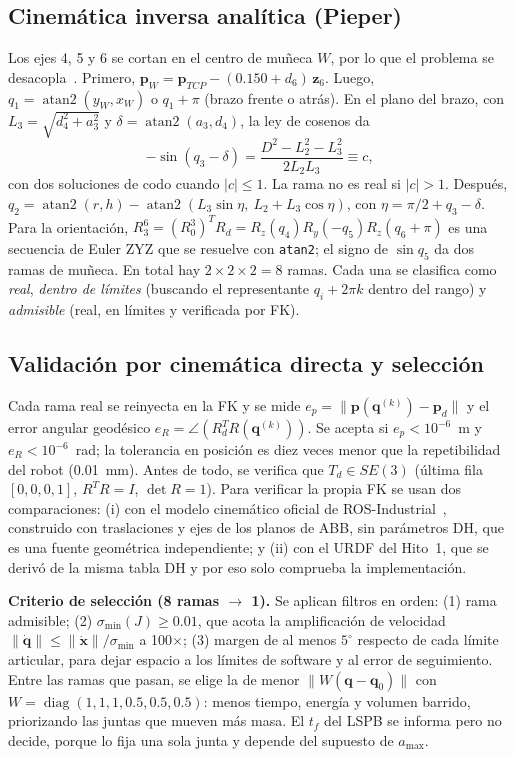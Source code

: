 \documentclass[conference]{IEEEtran}
\begin{document}
\subsection{Cinemática inversa analítica (Pieper)}
Los ejes 4, 5 y 6 se cortan en el centro de muñeca $W$, por lo que el problema se desacopla~\cite{pieper}. Primero,
$\mathbf{p}_W = \mathbf{p}_{TCP} - (0.150 + d_6)\,\mathbf{z}_6$. Luego,
$q_1 = \operatorname{atan2}(y_W, x_W)$ o $q_1 + \pi$ (brazo frente o atrás). En el plano del brazo, con
$L_3 = \sqrt{d_4^2 + a_3^2}$ y $\delta = \operatorname{atan2}(a_3, d_4)$, la ley de cosenos da
\begin{equation}
-\sin(q_3 - \delta) = \frac{D^2 - L_2^2 - L_3^2}{2L_2L_3} \equiv c,
\label{eq:cos}
\end{equation}
con dos soluciones de codo cuando $|c| \le 1$. La rama no es real si $|c| > 1$. Después,
$q_2 = \operatorname{atan2}(r, h) - \operatorname{atan2}(L_3\sin\eta,\ L_2 + L_3\cos\eta)$, con
$\eta = \pi/2 + q_3 - \delta$. Para la orientación,
$R_3^6 = (R_0^3)^TR_d = R_z(q_4)R_y(-q_5)R_z(q_6+\pi)$ es una secuencia de Euler ZYZ que se resuelve con
\texttt{atan2}; el signo de $\sin q_5$ da dos ramas de muñeca. En total hay $2\times2\times2 = 8$ ramas. Cada una se
clasifica como \emph{real}, \emph{dentro de límites} (buscando el representante $q_i + 2\pi k$ dentro del rango) y
\emph{admisible} (real, en límites y verificada por FK).

\subsection{Validación por cinemática directa y selección}
Cada rama real se reinyecta en la FK y se mide $e_p = \lVert\mathbf{p}(\mathbf{q}^{(k)}) - \mathbf{p}_d\rVert$ y el
error angular geodésico $e_R = \angle(R_d^TR(\mathbf{q}^{(k)}))$. Se acepta si $e_p < 10^{-6}$~m y
$e_R < 10^{-6}$~rad; la tolerancia en posición es diez veces menor que la repetibilidad del robot (0.01~mm). Antes de
todo, se verifica que $T_d \in SE(3)$ (última fila $[0,0,0,1]$, $R^TR = I$, $\det R = 1$). Para verificar la propia FK
se usan dos comparaciones: (i) con el modelo cinemático oficial de ROS-Industrial~\cite{rosi}, construido con
traslaciones y ejes de los planos de ABB, sin parámetros DH, que es una fuente geométrica independiente; y (ii) con el
URDF del Hito~1, que se derivó de la misma tabla DH y por eso solo comprueba la implementación.

\textbf{Criterio de selección (8 ramas $\to$ 1).} Se aplican filtros en orden: (1) rama admisible; (2)
$\sigma_{\min}(J) \ge 0.01$, que acota la amplificación de velocidad $\lVert\dot{\mathbf{q}}\rVert \le
\lVert\dot{\mathbf{x}}\rVert/\sigma_{\min}$ a 100$\times$; (3) margen de al menos $5^\circ$ respecto de cada límite
articular, para dejar espacio a los límites de software y al error de seguimiento. Entre las ramas que pasan, se elige la
de menor $\lVert W(\mathbf{q} - \mathbf{q}_0)\rVert$ con $W = \operatorname{diag}(1,1,1,0.5,0.5,0.5)$: menos tiempo,
energía y volumen barrido, priorizando las juntas que mueven más masa. El $t_f$ del LSPB se informa pero no decide,
porque lo fija una sola junta y depende del supuesto de $a_{\max}$.
\end{document}

